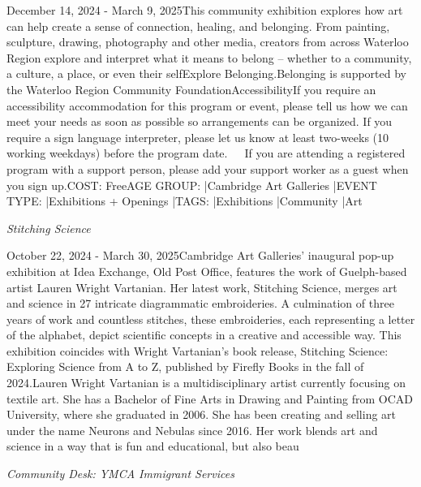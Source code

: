 \documentclass[letterpaper, 10pt]{article}
\newcommand{\subtitle}[1]{\textit{\large #1}\vspace{0.5em}}
\newcommand{\articlecontent}[1]{\small #1\vspace{1em}}
\begin{document}
\begin{multicols}{2}
{December 14, 2024 - March 9, 2025This community exhibition explores how art can help create a sense of connection, healing, and belonging. From painting, sculpture, drawing, photography and other media, creators from across Waterloo Region explore and interpret what it means to belong – whether to a community, a culture, a place, or even their selfExplore Belonging.Belonging is supported by the Waterloo Region Community FoundationAccessibilityIf you require an accessibility accommodation for this program or event, please tell us how we can meet your needs as soon as possible so arrangements can be organized. If you require a sign language interpreter, please let us know at least two-weeks (10 working weekdays) before the program date.   If you are attending a registered program with a support person, please add your support worker as a guest when you sign up.COST: FreeAGE GROUP: |Cambridge Art Galleries |EVENT TYPE: |Exhibitions + Openings |TAGS: |Exhibitions |Community |Art
}
\vspace{10px}

\subtitle{Stitching Science}

\articlecontent{

\qrcode[height=1.5cm]{https://ideaexchange.libnet.info/event/12111044}
\vspace{10px}

October 22, 2024 - March 30, 2025Cambridge Art Galleries' inaugural pop-up exhibition at Idea Exchange, Old Post Office, features the work of Guelph-based artist Lauren Wright Vartanian. Her latest work, Stitching Science, merges art and science in 27 intricate diagrammatic embroideries. A culmination of three years of work and countless stitches, these embroideries, each representing a letter of the alphabet, depict scientific concepts in a creative and accessible way. This exhibition coincides with Wright Vartanian’s book release, Stitching Science: Exploring Science from A to Z, published by Firefly Books in the fall of 2024.Lauren Wright Vartanian is a multidisciplinary artist currently focusing on textile art. She has a Bachelor of Fine Arts in Drawing and Painting from OCAD University, where she graduated in 2006. She has been creating and selling art under the name Neurons and Nebulas since 2016. Her work blends art and science in a way that is fun and educational, but also beau
}
\vspace{10px}

\subtitle{Community Desk: YMCA Immigrant Services}

\articlecontent{

}
\end{multicols}
\end{document}
